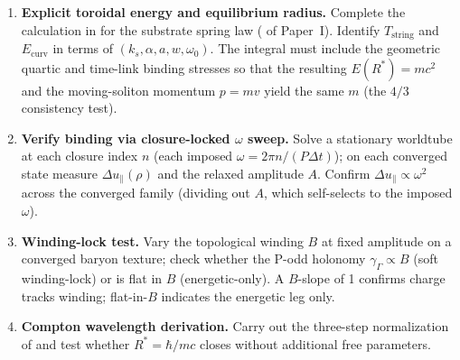\begin{enumerate}
  \item \textbf{Explicit toroidal energy and equilibrium radius.}
  Complete the calculation in  for the substrate spring law
  ( of Paper~I).
  Identify $T_{\mathrm{string}}$ and $E_{\mathrm{curv}}$ in terms of $(k_s,\alpha,a,w,\omega_0)$.
  The integral must include the geometric quartic and time-link binding stresses so that the
  resulting $E(R^*)=mc^2$ and the moving-soliton momentum $p=mv$ yield the same $m$ (the $4/3$
  consistency test).

  \item \textbf{Verify binding via closure-locked $\omega$ sweep.}
  Solve a stationary worldtube at each closure index $n$ (each imposed $\omega=2\pi n/(P\Delta t)$);
  on each converged state measure $\Delta u_\parallel(\rho)$ and the relaxed amplitude $A$.
  Confirm $\Delta u_\parallel\propto\omega^2$ across the converged family (dividing out $A$,
  which self-selects to the imposed $\omega$).

  \item \textbf{Winding-lock test.}
  Vary the topological winding $B$ at fixed amplitude on a converged baryon texture; check
  whether the P-odd holonomy $\gamma_\Gamma\propto B$ (soft winding-lock) or is flat in $B$
  (energetic-only).
  A $B$-slope of 1 confirms charge tracks winding; flat-in-$B$ indicates the energetic leg only.

  \item \textbf{Compton wavelength derivation.}
  Carry out the three-step normalization of  and test whether
  $R^*=\hbar/mc$ closes without additional free parameters.
\end{enumerate}